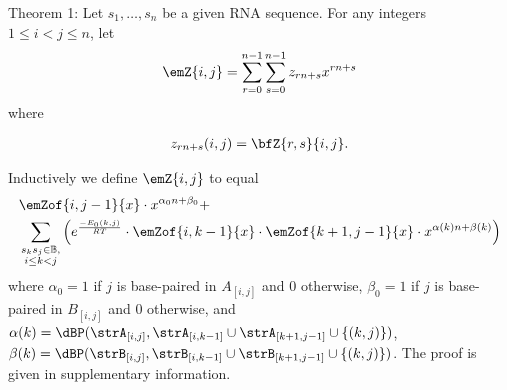 \noindent
{\sc Theorem 1:} Let $s_1,\ldots,s_n$ be a given RNA sequence.
For any integers $1 \leq i < j \leq n$, let
\begin{align}
\emZ{i,j} = \sum_{r=0}^{n-1} \sum_{s=0}^{n-1} z_{rn+s}  x^{rn+s}
\end{align}
where

\begin{align}
z_{rn+s}(i,j)= \bfZ{r,s}{i,j}.
\end{align}

Inductively we define $\emZ{i,j}$ to equal
\begin{align}
\label{eqn:polynomialRecursionNussJac}
&\emZof{i,j-1}{x} \cdot x^{\alpha_0n+\beta_0} + \\
&\sum_{\substack{s_k s_j \in \mathbb{B},\\i\le k<j}}
\left(e^{\frac{-E_0(k,j)}{RT}}\cdot
\emZof{i,k-1}{x} \cdot \emZof{k+1,j-1}{x}\cdot x^{\alpha(k)n+\beta(k)} \right)
\nonumber
\end{align}
where $\alpha_0 = 1$ if $j$ is base-paired in $A_{[i,j]}$ and $0$ otherwise,
$\beta_0 = 1$ if $j$ is base-paired in $B_{[i,j]}$ and $0$ otherwise, and
$\alpha(k)=\dBP(\strA_{[i,j]}, \strA_{[i,k-1]} \cup \strA_{[k+1,j-1]} \cup\{(k,j)\})$,
$\beta(k)=\dBP(\strB_{[i,j]}, \strB_{[i,k-1]} \cup \strB_{[k+1,j-1]} \cup\{(k,j)\})$.
The proof is given in supplementary information.
\medskip

